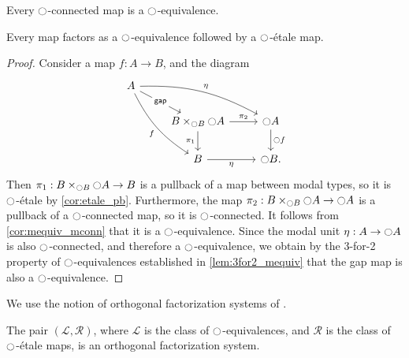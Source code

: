 \documentclass[9pt,twosided]{amsart}
\begin{document}
\begin{cor}\label{cor:mequiv_mconn}
Every ${\ocircle}$-connected map is a ${\ocircle}$-equivalence.
\end{cor}

\begin{lem}\label{lem:rfs_factor}
Every map factors as a ${\ocircle}$-equivalence followed by a ${\ocircle}$-\'etale map.
\end{lem}

\begin{proof}
Consider a map $f:A\to B$, and the diagram
\begin{equation*}
\begin{tikzcd}
A \arrow[ddr,bend right=15,swap,"f"] \arrow[drr,bend left=15,"\modalunit"] \arrow[dr,"\mathsf{gap}" description] \\
& B\times_{\modal B} \modal A \arrow[d,swap,"\pi_1"] \arrow[r,"\pi_2"] & \modal A \arrow[d,"\modal f"] \\
& B \arrow[r,swap,"\modalunit"] & \modal B.
\end{tikzcd}
\end{equation*}
Then $\pi_1:B\times_{{\ocircle} B} {\ocircle} A\to B$ is a pullback of a map between modal types, so it is ${\ocircle}$-\'etale by \cref{cor:etale_pb}. Furthermore, the map $\pi_2:B\times_{{\ocircle} B}{\ocircle} A\to {\ensuremath{\ocircle}} A$ is a pullback of a ${\ocircle}$-connected map, so it is ${\ocircle}$-connected. It follows from \cref{cor:mequiv_mconn} that it is a ${\ocircle}$-equivalence. Since the modal unit ${\eta_{}} :A\to{\ensuremath{\ocircle}} A$ is also ${\ocircle}$-connected, and therefore a ${\ocircle}$-equivalence, we obtain by the 3-for-2 property of ${\ocircle}$-equivalences established in \cref{lem:3for2_mequiv} that the gap map is also a ${\ocircle}$-equivalence.
\end{proof}

We use the notion of orthogonal factorization systems of \cite{RijkeSpittersShulman}.

\begin{thm}\label{lem:rfs_orthogonal}
  The pair $(\mathcal{L},\mathcal{R})$, where $\mathcal{L}$ is the class of ${\ocircle}$-equivalences, and $\mathcal{R}$ is the class of ${\ocircle}$-\'etale maps, is an orthogonal factorization system.
\end{thm}
\end{document}
